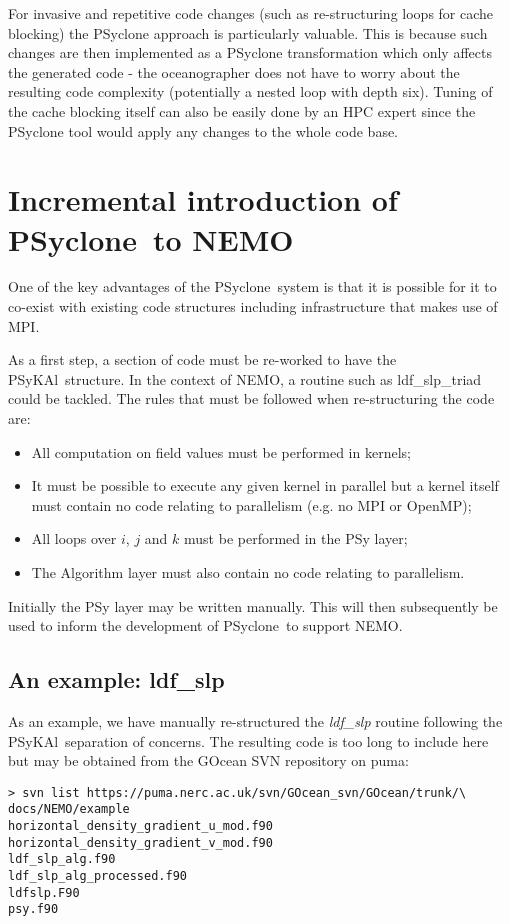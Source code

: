 \documentclass{article}
\newcommand{\psykal}{{PS}y{KA}l}
\newcommand{\psyclone}{{PS}yclone}
\begin{document}
For invasive and repetitive code changes (such as re-structuring loops
for cache blocking) the PSyclone approach is particularly
valuable. This is because such changes are then implemented as a
PSyclone transformation which only affects the generated code - the
oceanographer does not have to worry about the resulting code
complexity (potentially a nested loop with depth six). Tuning of the
cache blocking itself can also be easily done by an HPC expert since
the PSyclone tool would apply any changes to the whole code base.

\section{Incremental introduction of \psyclone\ to NEMO}

One of the key advantages of the \psyclone\ system is that it is
possible for it to co-exist with existing code structures including
infrastructure that makes use of MPI.

As a first step, a section of code must be re-worked to have the
\psykal\ structure. In the context of NEMO, a routine such as
ldf\_slp\_triad could be tackled. The rules that must be followed when
re-structuring the code are:
\begin{itemize}
\item All computation on field values must be performed in kernels;
\item It must be possible to execute any given kernel in parallel but
  a kernel itself must contain no code relating to parallelism
  (e.g. no MPI or OpenMP);
\item All loops over $i$, $j$ and $k$ must be performed in the PSy
  layer;
\item The Algorithm layer must also contain no code relating to
  parallelism.
\end{itemize}
Initially the PSy layer may be written manually. This will then
subsequently be used to inform the development of \psyclone\ to support
NEMO.

\subsection{An example: ldf\_slp}

As an example, we have manually re-structured the {\it ldf\_slp}
routine following the \psykal\ separation of concerns. The resulting
code is too long to include here but may be obtained from the GOcean
SVN repository on puma:
\begin{verbatim}
> svn list https://puma.nerc.ac.uk/svn/GOcean_svn/GOcean/trunk/\
docs/NEMO/example
horizontal_density_gradient_u_mod.f90
horizontal_density_gradient_v_mod.f90
ldf_slp_alg.f90
ldf_slp_alg_processed.f90
ldfslp.F90
psy.f90
\end{verbatim}
\end{document}
